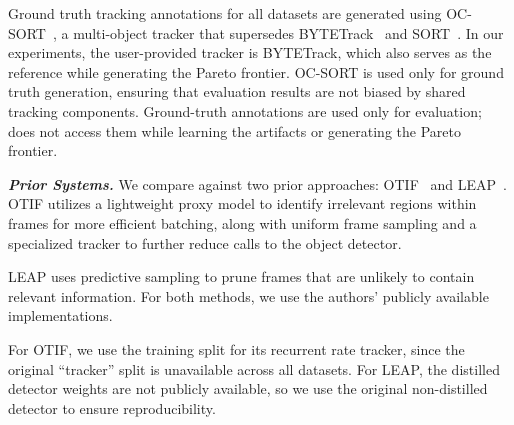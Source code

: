 Ground truth tracking annotations for all datasets are generated using OC-SORT~\cite{cao2023ocsort},
a multi-object tracker that supersedes BYTETrack~\cite{zhang2022bytetrack} and SORT~\cite{bewley2016sort}.
In our experiments, the user-provided tracker is BYTETrack,
which also serves as the reference while generating the Pareto frontier.
OC-SORT is used only for ground truth generation,
ensuring that evaluation results are not biased by shared tracking components.
Ground-truth annotations are used only for evaluation;
\sys does not access them while learning the artifacts or generating the Pareto frontier.

\textbf{\em Prior Systems.}
We compare \sys{} against two prior approaches: OTIF~\cite{bastani2022otif} and LEAP~\cite{xu2024leap}.
OTIF utilizes a lightweight proxy model to identify irrelevant regions within frames for more efficient batching, along with uniform frame sampling and a specialized tracker to further reduce calls to the object detector.

LEAP uses predictive sampling to prune frames that are unlikely to contain relevant information.
For both methods,
we use the authors' publicly available implementations.

For OTIF,
we use the training split for its recurrent rate tracker,
since the original ``tracker'' split is unavailable across all datasets.
For LEAP,
the distilled detector weights are not publicly available,
so we use the original non-distilled detector to ensure reproducibility.


